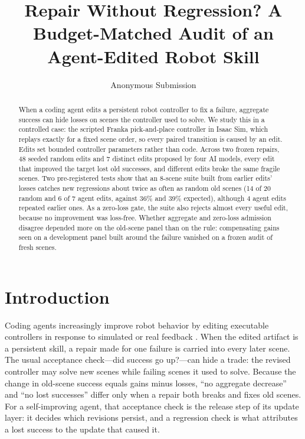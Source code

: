 \documentclass[letterpaper]{article} %
\title{Repair Without Regression? A Budget-Matched Audit of an Agent-Edited Robot Skill}
\author{
    Anonymous Submission
}
\begin{document}
\maketitle

\begin{abstract}
When a coding agent edits a persistent robot controller to fix a failure, aggregate success can hide losses on scenes the controller used to solve. We study this in a controlled case: the scripted Franka pick-and-place controller in Isaac Sim, which replays exactly for a fixed scene order, so every paired transition is caused by an edit. Edits set bounded controller parameters rather than code. Across two frozen repairs, 48 seeded random edits and 7 distinct edits proposed by four AI models, every edit that improved the target lost old successes, and different edits broke the same fragile scenes. Two pre-registered tests show that an 8-scene suite built from earlier edits' losses catches new regressions about twice as often as random old scenes (14 of 20 random and 6 of 7 agent edits, against 36\% and 39\% expected), although 4 agent edits repeated earlier ones. As a zero-loss gate, the suite also rejects almost every useful edit, because no improvement was loss-free. Whether aggregate and zero-loss admission disagree depended more on the old-scene panel than on the rule: compensating gains seen on a development panel built around the failure vanished on a frozen audit of fresh scenes.
\end{abstract}

\section{Introduction}
Coding agents increasingly improve robot behavior by editing executable controllers in response to simulated or real feedback \citep{kuroki2026closedloop,xiao2026enpire,aphale2026selfrepair}. When the edited artifact is a persistent skill, a repair made for one failure is carried into every later scene. The usual acceptance check---did success go up?---can hide a trade: the revised controller may solve new scenes while failing scenes it used to solve. Because the change in old-scene success equals gains minus losses, ``no aggregate decrease'' and ``no lost successes'' differ only when a repair both breaks and fixes old scenes. For a self-improving agent, that acceptance check is the release step of its update layer: it decides which revisions persist, and a regression check is what attributes a lost success to the update that caused it.
\end{document}
